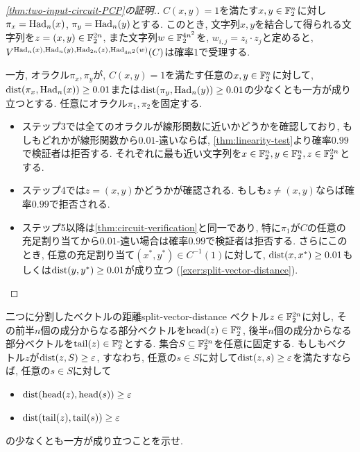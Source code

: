 \begin{proof}[\cref{thm:two-input-circuit-PCP}の証明.]
$C(x,y)=1$を満たす$x,y\in\mathbb{F}_2^n$に対し$\pi_x=\mathrm{Had}_n(x)$, $\pi_y=\mathrm{Had}_n(y)$とする.
このとき, 文字列$x,y$を結合して得られる文字列を$z=(x,y)\in\mathbb{F}_2^{2n}$,
また文字列$w\in\mathbb{F}_2^{4n^2}$を, $w_{i,j}=z_i\cdot z_j$と定めると,
$V^{\mathrm{Had}_n(x),\mathrm{Had}_n(y),\mathrm{Had}_{2n}(z),\mathrm{Had}_{4n^2}(w)}(C)$は確率$1$で受理する.

一方, オラクル$\pi_x,\pi_y$が, $C(x,y)=1$を満たす任意の$x,y\in\mathbb{F}_2^n$に対して, $\mathrm{dist}(\pi_x,\mathrm{Had}_n(x))\ge 0.01$または$\mathrm{dist}(\pi_y,\mathrm{Had}_n(y))\ge0.01$の少なくとも一方が成り立つとする.
任意にオラクル$\pi_1,\pi_2$を固定する.
\begin{itemize}
  \item ステップ3では全てのオラクルが線形関数に近いかどうかを確認しており, もしもどれかが線形関数から$0.01$-遠いならば, \cref{thm:linearity-test}より確率$0.99$で検証者は拒否する. それぞれに最も近い文字列を$x\in\mathbb{F}_2^n,y\in\mathbb{F}_2^n,z\in\mathbb{F}_2^{2n}$とする.
  \item ステップ4では$z=(x,y)$かどうかが確認される. もしも$z\ne(x,y)$ならば確率$0.99$で拒否される.
  \item ステップ5以降は\cref{thm:circuit-verification}と同一であり, 特に$\pi_1$が$C$の任意の充足割り当てから$0.01$-遠い場合は確率$0.99$で検証者は拒否する. さらにこのとき, 任意の充足割り当て$(x^*,y^*)\in C^{-1}(1)$に対して, $\mathrm{dist}(x,x^*)\ge0.01$もしくは$\mathrm{dist}(y,y^*)\ge 0.01$が成り立つ (\cref{exer:split-vector-distance}).
\end{itemize}
\end{proof}

\begin{exercise}{二つに分割したベクトルの距離}{split-vector-distance}
  ベクトル$z\in\mathbb{F}_2^{2n}$に対し, その前半$n$個の成分からなる部分ベクトルを$\mathrm{head}(z)\in\mathbb{F}_2^n$, 後半$n$個の成分からなる部分ベクトルを$\mathrm{tail}(z)\in\mathbb{F}_2^n$とする.
  集合$S\subseteq\mathbb{F}_2^{2n}$を任意に固定する.
  もしもベクトル$z$が$\mathrm{dist}(z,S)\ge \varepsilon$, すなわち, 任意の$s\in S$に対して$\mathrm{dist}(z,s)\ge \varepsilon$を満たすならば,
  任意の$s\in S$に対して
  \begin{itemize}
  \item $\mathrm{dist}(\mathrm{head}(z),\mathrm{head}(s))\ge \varepsilon$
  \item $\mathrm{dist}(\mathrm{tail}(z),\mathrm{tail}(s))\ge \varepsilon$
  \end{itemize}
  の少なくとも一方が成り立つことを示せ.
\end{exercise}